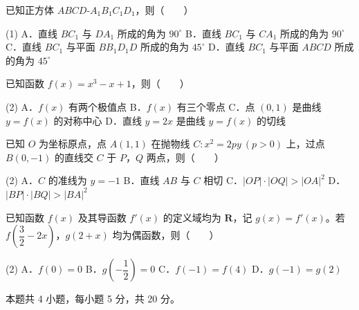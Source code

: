\begin{question}
已知正方体 $ABCD\text{-}A_1B_1C_1D_1$，则（　　）

\begin{gkopts}(1)
\task A．直线 $BC_1$ 与 $DA_1$ 所成的角为 $90^\circ$
\task B．直线 $BC_1$ 与 $CA_1$ 所成的角为 $90^\circ$
\task C．直线 $BC_1$ 与平面 $BB_1D_1D$ 所成的角为 $45^\circ$
\task D．直线 $BC_1$ 与平面 $ABCD$ 所成的角为 $45^\circ$
\end{gkopts}

\end{question}
\begin{question}
已知函数 $f(x)=x^{3}-x+1$，则（　　）

\begin{gkopts}(2)
\task A．$f(x)$ 有两个极值点
\task B．$f(x)$ 有三个零点
\task C．点 $(0,1)$ 是曲线 $y=f(x)$ 的对称中心
\task D．直线 $y=2x$ 是曲线 $y=f(x)$ 的切线
\end{gkopts}

\end{question}
\begin{question}
已知 $O$ 为坐标原点，点 $A(1,1)$ 在抛物线 $C:x^{2}=2py\ (p>0)$ 上，过点 $B(0,-1)$ 的直线交 $C$ 于 $P$，$Q$ 两点，则（　　）

\begin{gkopts}(2)
\task A．$C$ 的准线为 $y=-1$
\task B．直线 $AB$ 与 $C$ 相切
\task C．$|OP|\cdot|OQ|>|OA|^{2}$
\task D．$|BP|\cdot|BQ|>|BA|^{2}$
\end{gkopts}

\end{question}
\begin{question}
已知函数 $f(x)$ 及其导函数 $f'(x)$ 的定义域均为 $\mathbf R$，记 $g(x)=f'(x)$。若 $f\left(\dfrac32-2x\right)$，$g(2+x)$ 均为偶函数，则（　　）

\begin{gkopts}(2)
\task A．$f(0)=0$
\task B．$g\left(-\dfrac12\right)=0$
\task C．$f(-1)=f(4)$
\task D．$g(-1)=g(2)$
\end{gkopts}

\par\medskip

\end{question}

\begin{gktip}
本题共 4 小题，每小题 5 分，共 20 分。
\end{gktip}

